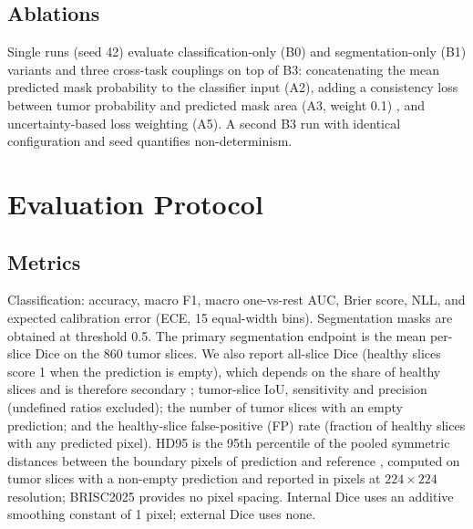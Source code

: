 \documentclass[journal]{IEEEtran}
\begin{document}
\subsection{Ablations}
Single runs (seed 42) evaluate classification-only (B0) and segmentation-only (B1) variants and three cross-task couplings on top of B3: concatenating the mean predicted mask probability to the classifier input (A2), adding a consistency loss between tumor probability and predicted mask area (A3, weight 0.1) \cite{luo2021semi}, and uncertainty-based loss weighting \cite{kendall2018multi} (A5). A second B3 run with identical configuration and seed quantifies non-determinism.

\section{Evaluation Protocol}
\subsection{Metrics}
Classification: accuracy, macro F1, macro one-vs-rest AUC, Brier score, NLL, and expected calibration error (ECE, 15 equal-width bins). Segmentation masks are obtained at threshold 0.5. The primary segmentation endpoint is the mean per-slice Dice on the 860 tumor slices. We also report all-slice Dice (healthy slices score 1 when the prediction is empty), which depends on the share of healthy slices and is therefore secondary \cite{maierhein2024metrics}; tumor-slice IoU, sensitivity and precision (undefined ratios excluded); the number of tumor slices with an empty prediction; and the healthy-slice false-positive (FP) rate (fraction of healthy slices with any predicted pixel). HD95 is the 95th percentile of the pooled symmetric distances between the boundary pixels of prediction and reference \cite{maierhein2024metrics}, computed on tumor slices with a non-empty prediction and reported in pixels at $224\times224$ resolution; BRISC2025 provides no pixel spacing. Internal Dice uses an additive smoothing constant of 1 pixel; external Dice uses none.
\end{document}
